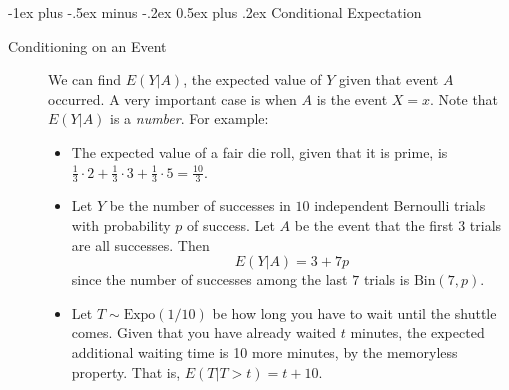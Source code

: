 \documentclass[6pt, landscape]{article}
\makeatletter
\renewcommand{\section}{\@startsection{section}{1}{0mm}%
                                {-1ex plus -.5ex minus -.2ex}%
                                {0.5ex plus .2ex}%
                                {\normalfont\bfseries}}
\newcommand{\Bin}{\textrm{Bin}}
\newcommand{\Expo}{\textrm{Expo}}
\makeatother
\begin{document}
\begin{multicols}{3}
        \section{Conditional Expectation}
        \begin{description}
                \item[Conditioning on an Event] We can find $E(Y|A)$, the expected value of $Y$ given that event $A$ occurred. A very important case is when $A$ is the event $X=x$. Note that $E(Y|A)$ is a \emph{number}. For example:
                      \begin{itemize}
                              \item The expected value of a fair die roll, given that it is prime, is $\frac{1}{3} \cdot 2 + \frac{1}{3} \cdot 3 + \frac{1}{3} \cdot 5 = \frac{10}{3}$.
                              \item Let $Y$ be the number of successes in $10$ independent Bernoulli trials with probability $p$ of success. Let $A$ be the event that the first $3$ trials are all successes. Then
                                    $$E(Y|A) = 3 + 7p$$
                                    since the number of successes among the last $7$ trials is $\Bin(7,p)$.
                              \item Let $T \sim \Expo(1/10)$ be how long you have to wait until the shuttle comes. Given that you have already waited $t$ minutes, the expected additional waiting time is 10 more minutes, by the memoryless property. That is, $E(T|T>t) = t + 10$.
                      \end{itemize}
        \end{description}
        \medskip

\end{multicols}
\end{document}
